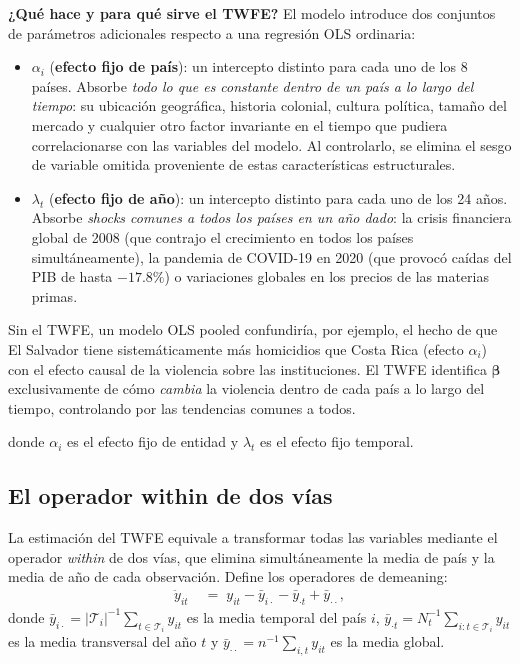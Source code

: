 \documentclass[12pt, a4paper]{article}
\theoremstyle{definition}
\begin{document}
\begin{intuitionbox}
\textbf{¿Qué hace y para qué sirve el TWFE?} El modelo introduce dos conjuntos de parámetros adicionales respecto a una regresión OLS ordinaria:

\begin{itemize}
  \item $\alpha_i$ (\textbf{efecto fijo de país}): un intercepto distinto para cada uno de los 8 países. Absorbe \emph{todo lo que es constante dentro de un país a lo largo del tiempo}: su ubicación geográfica, historia colonial, cultura política, tamaño del mercado y cualquier otro factor invariante en el tiempo que pudiera correlacionarse con las variables del modelo. Al controlarlo, se elimina el sesgo de variable omitida proveniente de estas características estructurales.
  
  \item $\lambda_t$ (\textbf{efecto fijo de año}): un intercepto distinto para cada uno de los 24 años. Absorbe \emph{shocks comunes a todos los países en un año dado}: la crisis financiera global de 2008 (que contrajo el crecimiento en todos los países simultáneamente), la pandemia de COVID-19 en 2020 (que provocó caídas del PIB de hasta $-17.8\%$) o variaciones globales en los precios de las materias primas.
\end{itemize}

Sin el TWFE, un modelo OLS pooled confundiría, por ejemplo, el hecho de que El Salvador tiene sistemáticamente más homicidios que Costa Rica (efecto $\alpha_i$) con el efecto causal de la violencia sobre las instituciones. El TWFE identifica $\bm{\beta}$ exclusivamente de cómo \emph{cambia} la violencia dentro de cada país a lo largo del tiempo, controlando por las tendencias comunes a todos.
\end{intuitionbox}

donde $\alpha_i$ es el efecto fijo de entidad y $\lambda_t$ es el efecto fijo temporal.

\subsection{El operador within de dos vías}

La estimación del TWFE equivale a transformar todas las variables mediante el operador \emph{within} de dos vías, que elimina simultáneamente la media de país y la media de año de cada observación. Define los operadores de demeaning:
\begin{align*}
  \ddot{y}_{it} &\;=\; y_{it} - \bar{y}_{i\cdot} - \bar{y}_{\cdot t} + \bar{y}_{\cdot\cdot},
\end{align*}
donde $\bar{y}_{i\cdot} = |\mathcal{T}_i|^{-1}\sum_{t \in \mathcal{T}_i} y_{it}$ es la media temporal del país $i$, $\bar{y}_{\cdot t} = N_t^{-1}\sum_{i: t\in\mathcal{T}_i} y_{it}$ es la media transversal del año $t$ y $\bar{y}_{\cdot\cdot} = n^{-1}\sum_{i,t}y_{it}$ es la media global.
\end{document}
